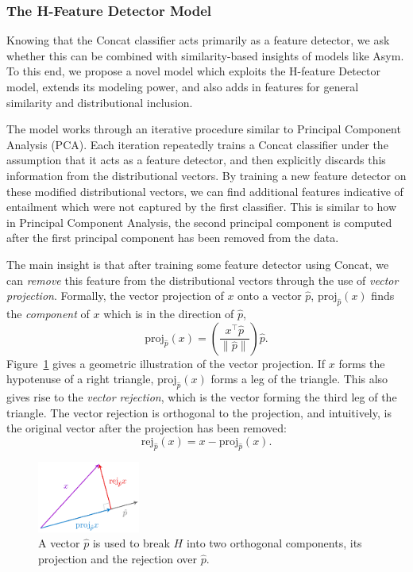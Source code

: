 \documentclass[12pt]{article}
\begin{document}
\subsubsection{The H-Feature Detector Model}

Knowing that the Concat classifier acts primarily as a feature detector, we ask
whether this can be combined with similarity-based insights of models like
Asym. To this end, we propose a novel model which exploits the H-feature
Detector model, extends its modeling power, and also adds in features for
general similarity and distributional inclusion.

The model works through an iterative procedure similar to Principal Component
Analysis (PCA). Each iteration repeatedly trains a Concat classifier under the
assumption that it acts as a feature detector, and then explicitly discards
this information from the distributional vectors. By training a new feature
detector on these modified distributional vectors, we can find additional
features indicative of entailment which were not captured by the first
classifier. This is similar to how in Principal Component Analysis, the
second principal component is computed after the first principal component
has been removed from the data.

The main insight is that after training some feature detector using Concat,
we can {\em remove} this feature from the distributional vectors through
the use of {\em vector projection}.
Formally, the vector projection of $x$ onto
a vector $\hat p$, $\text{proj}_{\hat p}(x)$ finds the {\em component} of $x$
which is in the direction of $\hat p$,
\begin{equation*}
  \text{proj}_{\hat p}(x) = \left(\frac{x^\top\hat p}{\|\hat p\|}\right)\hat p.
\end{equation*}
Figure~\ref{fig:vecproj} gives a geometric illustration of the vector
projection. If $x$ forms the hypotenuse of a right
triangle, $\text{proj}_{\hat p}(x)$ forms a leg of the triangle. This also
gives rise to the {\em vector rejection}, which is the vector forming the third
leg of the triangle. The vector rejection is orthogonal to the projection, and
intuitively, is the original vector after the projection has been removed:
\begin{equation*}
  \text{rej}_{\hat p}(x) = x - \text{proj}_{\hat p}(x).
\end{equation*}

\begin{figure}
  \begin{center}
  \includegraphics[width=0.30\textwidth]{figures/vecproj}
\end{center}
\caption{A vector $\hat p$ is used to break $H$ into two orthogonal components,
its projection and the rejection over $\hat p$.}
\label{fig:vecproj}
\end{figure}
\end{document}
